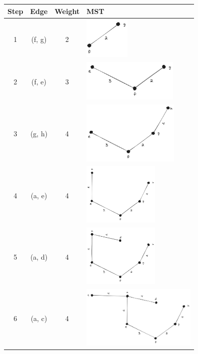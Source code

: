 \documentclass[12pt,titlepage]{article}
\begin{document}
\begin{table}[h]
    \begin{tabularx}{\textwidth}{|c|c|c|X|}
        \hline
        \textbf{Step} & \textbf{Edge} & \textbf{Weight} & \textbf{MST} \\
        \hline
        1 & (f, g) & 2 & \includegraphics[height=2cm]{./images/tree-f-g.png} \\
        \hline
        2 & (f, e) & 3 & \includegraphics[height=2cm]{./images/tree-f-e.png} \\
        \hline
        3 & (g, h) & 4 & \includegraphics[height=3cm]{./images/tree-g-h.png} \\
        \hline
        4 & (a, e) & 4 & \includegraphics[height=3cm]{./images/tree-e-a.png} \\
        \hline
        5 & (a, d) & 4 & \includegraphics[height=3cm]{./images/tree-a-d.png} \\
        \hline
        6 & (a, c) & 4 & \includegraphics[height=3cm]{./images/tree-a-c.png} \\

\end{tabularx}
\end{table}
\end{document}
